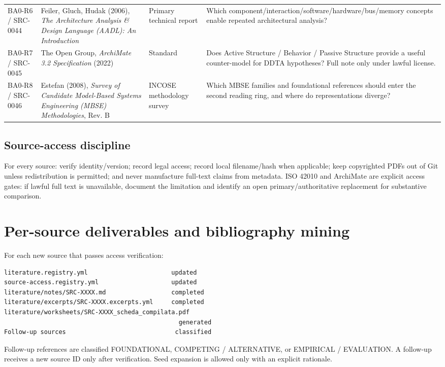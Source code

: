 \documentclass[11pt,a4paper]{article}
\begin{document}
\begin{longtable}{p{1.45cm}p{4.3cm}p{2.3cm}p{5.8cm}}
BA0-R6 / SRC-0044 & Feiler, Gluch, Hudak (2006), \emph{The Architecture Analysis \& Design Language (AADL): An Introduction} & Primary technical report & Which component/interaction/software/hardware/bus/memory concepts enable repeated architectural analysis?\\
BA0-R7 / SRC-0045 & The Open Group, \emph{ArchiMate 3.2 Specification} (2022) & Standard & Does Active Structure / Behavior / Passive Structure provide a useful counter-model for DDTA hypotheses? Full note only under lawful license.\\
BA0-R8 / SRC-0046 & Estefan (2008), \emph{Survey of Candidate Model-Based Systems Engineering (MBSE) Methodologies}, Rev. B & INCOSE methodology survey & Which MBSE families and foundational references should enter the second reading ring, and where do representations diverge?\\
\end{longtable}\endgroup

\subsection{Source-access discipline}
For every source: verify identity/version; record legal access; record local filename/hash when applicable; keep copyrighted PDFs out of Git unless redistribution is permitted; and never manufacture full-text claims from metadata. ISO 42010 and ArchiMate are explicit access gates: if lawful full text is unavailable, document the limitation and identify an open primary/authoritative replacement for substantive comparison.

\section{Per-source deliverables and bibliography mining}
For each new source that passes access verification:
\begin{lstlisting}
literature.registry.yml                       updated
source-access.registry.yml                    updated
literature/notes/SRC-XXXX.md                  completed
literature/excerpts/SRC-XXXX.excerpts.yml     completed
literature/worksheets/SRC-XXXX_scheda_compilata.pdf
                                                generated
Follow-up sources                              classified
\end{lstlisting}
Follow-up references are classified FOUNDATIONAL, COMPETING / ALTERNATIVE, or EMPIRICAL / EVALUATION. A follow-up receives a new source ID only after verification. Seed expansion is allowed only with an explicit rationale.
\end{document}
